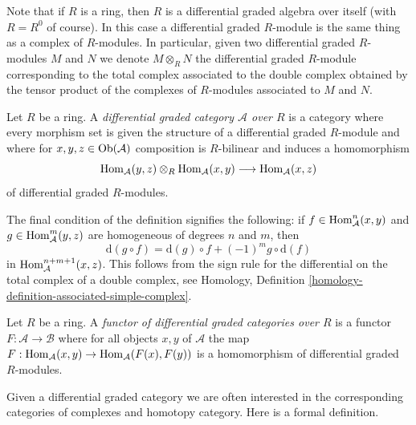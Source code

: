 \noindent
Note that if $R$ is a ring, then $R$ is a differential graded algebra
over itself (with $R = R^0$ of course). In this case a differential
graded $R$-module is the same thing as a complex of $R$-modules.
In particular, given two differential graded $R$-modules $M$ and $N$
we denote $M \otimes_R N$ the differential graded $R$-module
corresponding to the total complex associated to the double
complex obtained by the tensor product of the complexes of $R$-modules
associated to $M$ and $N$.

\begin{definition}
\label{definition-dga-category}
Let $R$ be a ring. A {\it differential graded category $\mathcal{A}$
over $R$} is a category where every morphism set is given the structure
of a differential graded $R$-module and where for
$x, y, z \in \mathop{\mathrm{Ob}}\nolimits(\mathcal{A})$ composition is $R$-bilinear and induces
a homomorphism
$$
\mathop{\mathrm{Hom}}\nolimits_\mathcal{A}(y, z) \otimes_R \mathop{\mathrm{Hom}}\nolimits_\mathcal{A}(x, y)
\longrightarrow
\mathop{\mathrm{Hom}}\nolimits_\mathcal{A}(x, z)
$$
of differential graded $R$-modules.
\end{definition}

\noindent
The final condition of the definition signifies the following:
if $f \in \mathop{\mathrm{Hom}}\nolimits_\mathcal{A}^n(x, y)$ and
$g \in \mathop{\mathrm{Hom}}\nolimits_\mathcal{A}^m(y, z)$ are homogeneous
of degrees $n$ and $m$, then
$$
\text{d}(g \circ f) = \text{d}(g) \circ f + (-1)^mg \circ \text{d}(f)
$$
in $\mathop{\mathrm{Hom}}\nolimits_\mathcal{A}^{n + m + 1}(x, z)$. This follows from the sign
rule for the differential on the total complex of a double complex, see
Homology, Definition \ref{homology-definition-associated-simple-complex}.

\begin{definition}
\label{definition-functor-dga-categories}
Let $R$ be a ring. A {\it functor of differential graded categories over $R$}
is a functor $F : \mathcal{A} \to \mathcal{B}$ where for all objects
$x, y$ of $\mathcal{A}$ the map
$F : \mathop{\mathrm{Hom}}\nolimits_\mathcal{A}(x, y) \to \mathop{\mathrm{Hom}}\nolimits_\mathcal{A}(F(x), F(y))$
is a homomorphism of differential graded $R$-modules.
\end{definition}

\noindent
Given a differential graded category we are often interested in the
corresponding categories of complexes and homotopy category.
Here is a formal definition.

